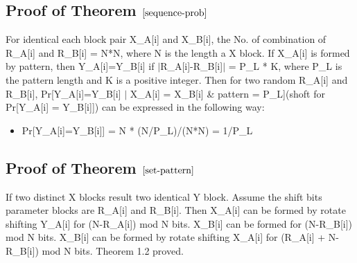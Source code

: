 \documentclass{article}
\begin{document}
\subsection{Proof of Theorem $\ref{sequence-prob}$}
For identical each block pair X\_A[i] and X\_B[i], the No. of combination of R\_A[i] and R\_B[i] = N*N, where N is the length a X block. 
If X\_A[i] is formed by pattern, then Y\_A[i]=Y\_B[i] if $\mid$R\_A[i]-R\_B[i]$\mid$ = P\_L * K, where P\_L is the pattern length and K is a positive integer. 
Then for two random R\_A[i] and R\_B[i], Pr[Y\_A[i]=Y\_B[i] $\mid$ X\_A[i] = X\_B[i] \& pattern = P\_L](shoft for Pr[Y\_A[i] = Y\_B[i]]) can be expressed in the following way:
\begin{itemize}
	\item Pr[Y\_A[i]=Y\_B[i]] = N * (N/P\_L)/(N*N) = 1/P\_L
\end{itemize} 

\subsection{Proof of Theorem $\ref{set-pattern}$}
If two distinct X blocks result two identical Y block. Assume the shift bits parameter blocks are R\_A[i] and R\_B[i]. Then X\_A[i] can be formed by rotate shifting Y\_A[i] for (N-R\_A[i]) mod N bits. X\_B[i] can be formed for (N-R\_B[i]) mod N bits.
X\_B[i] can be formed by rotate shifting X\_A[i] for (R\_A[i] + N-R\_B[i]) mod N bits. Theorem 1.2 proved.

\end{document}
